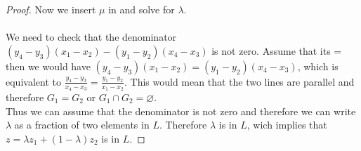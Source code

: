\begin{proof}
    Now we insert $\mu$ in  and solve for $\lambda$.\\
    \\
    We need to check that the denominator $(y_4-y_3)(x_1 - x_2)- (y_1 - y_2)(x_4-x_3)$ is not zero.
    Assume that its = then we would have $(y_4-y_3)(x_1 - x_2) = (y_1 - y_2)(x_4-x_3)$, which is equivalent to $\frac{y_4-y_3}{x_4-x_3} = \frac{y_1 - y_2}{x_1 - x_2}$. 
    This would mean that the two lines are parallel and therefore $G_1 = G_2$ or $G_1 \cap G_2 = \varnothing$.\\
    Thus we can assume that the denominator is not zero and therefore we can write $\lambda$ as a fraction of two elements in $L$. Therefore $\lambda$ is in $L$, wich implies that $z = \lambda z_1 + (1-\lambda)z_2$ is in $L$.

\end{proof}

